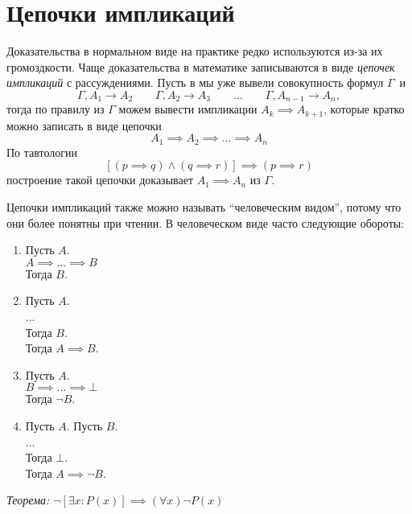 \section{Цепочки импликаций}

Доказательства в нормальном виде на практике редко используются из-за их
громоздкости.
Чаще доказательства в математике записываются в виде {\it цепочек импликаций}
 с рассуждениями.
Пусть в мы уже вывели совокупность формул $\Gamma$~и
\[
  \Gamma,A_1\to A_2\qquad \Gamma,A_2\to A_3
  \qquad  ... \qquad \Gamma,A_{n-1}\to A_{n},
\]
тогда по правилу \implic{} из $\Gamma$ можем вывести импликации
${A_{k}\implies A_{k+1}}$, которые кратко можно записать в виде цепочки
\[
  A_1\implies A_2\implies ...\implies A_{n}
\]
По тавтологии
\[
  [(p\implies q)\land (q\implies r)]\implies (p\implies r)
\]
построение такой цепочки доказывает $A_1\implies A_{n}$ из $\Gamma$.

Цепочки импликаций также можно называть ``человеческим видом'', потому что они более
понятны при чтении.
В человеческом виде часто следующие обороты:
\begin{fullwidth}
  \begin{multicols}{4}
    \begin{enumerate}[label=(\roman*)]
      \item{}
      Пусть $A$.\\
      $A\implies...\implies B$\\
      Тогда $B$.
      \item{}
      Пусть $A$.\\
      ...\\
      Тогда $B$.\\
      Тогда $A\implies B$.
      \item{}
      Пусть $A$.\\
      $B\implies ...\implies \bot$\\
      Тогда $\lnot B$.
      \item{}
      Пусть $A$. Пусть $B$.\\
      ...\\
      Тогда $\bot$.\\
      Тогда $A\implies \lnot B$.
    \end{enumerate}
  \end{multicols}
\end{fullwidth}

{\it Теорема:} $\lnot[\exists x:P(x)]\implies (\forall x)\lnot P(x)$

